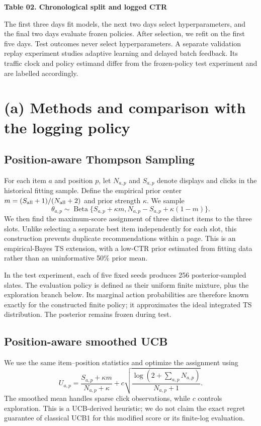 \documentclass[11pt,a4paper]{article}
\newcommand{\resulttable}[2]{%
  \par\medskip\noindent\begin{minipage}{\linewidth}\centering
  \textbf{Table #1. #2}\par\medskip\small
  \sbox{\resultbox}{}%
  \ifdim\wd\resultbox>\linewidth
    \resizebox{\linewidth}{!}{\usebox{\resultbox}}%
  \else\usebox{\resultbox}\fi
  \end{minipage}\par\medskip}
\begin{document}
\resulttable{02}{Chronological split and logged CTR}
The first three days fit models, the next two days select hyperparameters, and the final
two days evaluate frozen policies. After selection, we refit on the first five days.
Test outcomes never select hyperparameters. A separate validation replay experiment
studies adaptive learning and delayed batch feedback. Its traffic clock and policy
estimand differ from the frozen-policy test experiment and are labelled accordingly.

\section{(a) Methods and comparison with the logging policy}
\subsection{Position-aware Thompson Sampling}
For each item $a$ and position $p$, let $N_{a,p}$ and $S_{a,p}$ denote displays and clicks
in the historical fitting sample. Define the empirical prior center
$m=(S_{\rm all}+1)/(N_{\rm all}+2)$ and prior strength $\kappa$. We sample
\[
\theta_{a,p}\sim\operatorname{Beta}\{S_{a,p}+\kappa m,
N_{a,p}-S_{a,p}+\kappa(1-m)\}.
\]
We then find the maximum-score assignment of three distinct items to the three slots.
Unlike selecting a separate best item independently for each slot, this construction
prevents duplicate recommendations within a page.
This is an empirical-Bayes TS extension, with a low-CTR prior estimated from fitting
data rather than an uninformative 50\% prior mean.

In the test experiment, each of five fixed seeds produces 256 posterior-sampled slates.
The evaluation policy is defined as their uniform finite mixture, plus the exploration
branch below. Its marginal action probabilities are therefore known exactly for the
constructed finite policy; it approximates the ideal integrated TS distribution.
The posterior remains frozen during test.

\subsection{Position-aware smoothed UCB}
We use the same item--position statistics and optimize the assignment using
\[
U_{a,p}=\frac{S_{a,p}+\kappa m}{N_{a,p}+\kappa}
+c\sqrt{\frac{\log(2+\sum_{a,p}N_{a,p})}{N_{a,p}+1}}.
\]
The smoothed mean handles sparse click observations, while $c$ controls exploration.
This is a UCB-derived heuristic; we do not claim the exact regret guarantee of classical
UCB1 for this modified score or its finite-log evaluation.
\end{document}

